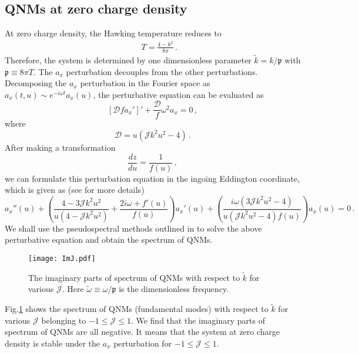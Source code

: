 \documentclass[preprint,onecolumn,nofootinbib]{revtex4}
\newcommand{\fa}{\begin{eqnarray}}
\newcommand{\ffa}{\end{eqnarray}}
\begin{document}
\subsection{QNMs at zero charge density}

At zero charge density, the Hawking temperature reduces to
\fa
&&
T=\frac{4-k^2}{8\pi}
\,.
\label{T-SS}
\ffa
Therefore, the system is determined by one dimensionless parameter $\tilde{k}=k /\mathfrak{p}$ with $\mathfrak{p}\equiv 8\pi T$. The $a_x$ perturbation decouples from the other perturbations. Decomposing the $a_x$ perturbation in the Fourier space as $a_x(t,u)\sim e^{-i\omega t} a_x(u)$, the perturbative equation can be evaluated as
\begin{equation}
	\label{eq:axeomJmu=0}
\left[\mathcal{D}fa_x'\right]'+\frac{\mathcal{D}}{f} \omega^2 a_x=0\,,
\end{equation}
where
\begin{equation}
\mathcal{D}=u(\mathcal{J} k^2 u^2-4)\,.
\end{equation}
After making a transformation
\begin{equation}
\frac{dz}{du}=\frac{1}{f(u)}\,,
\end{equation}
we can formulate this perturbation equation in the ingoing Eddington coordinate, which is given as (see \cite{Horowitz:1999jd,Jansen:2017oag,Wu:2018vlj,Fu:2018yqx,Liu:2020lwc} for more details)  
\begin{equation}
	a_x''(u)+\left(\frac{4-3\mathcal{J}k^2u^2}{u(4-\mathcal{J} k^2 u^2)}+\frac{2i \omega+f'(u)}{f(u)}\right)a_x'(u)+\left(\frac{i\omega(3\mathcal{J}k^2u^2-4)}{u(\mathcal{J}k^2u^2-4)f(u)}\right)a_x(u)=0\,.
\end{equation}
We shall use the pseudospectral methods outlined in \cite{Jansen:2017oag} to solve the above perturbative equation and obtain the spectrum of QNMs.

\begin{figure}[H]
	\centering
	\texttt{[image: ImJ.pdf]}
	\caption{The imaginary parts of spectrum of QNMs with respect to $\tilde{k}$ for various $\mathcal{J}$. Here $\tilde{\omega}\equiv\omega/\mathfrak{p}$ is the dimensionless frequency.}
	\label{fig:QNMs}
\end{figure}

Fig.\ref{fig:QNMs} shows the spectrum of QNMs (fundamental modes) with respect to $\tilde{k}$ for various $\mathcal{J}$ belonging to $-1\leq\mathcal{J}\leq 1$. We find that the imaginary parts of spectrum of QNMs are all negative. It means that the system at zero charge density is stable under the $a_x$ perturbation for $-1\leq\mathcal{J}\leq 1$.
\end{document}

